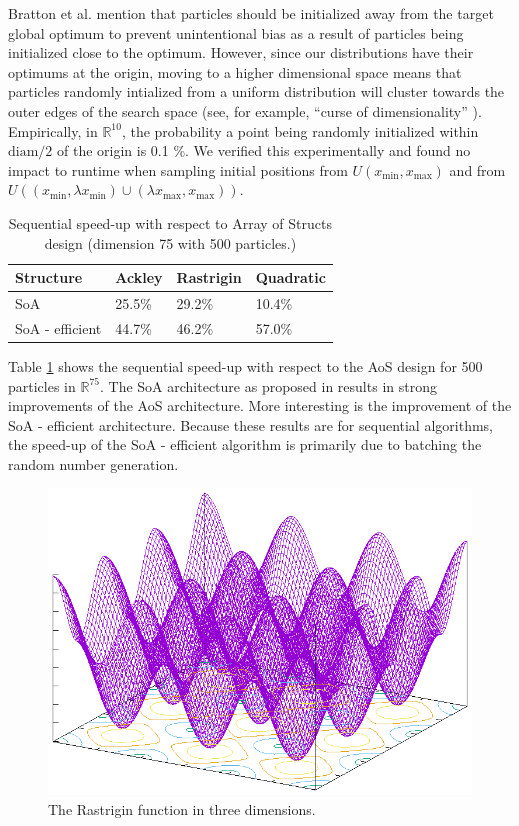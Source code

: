 Bratton et al. \cite{spso} mention that particles should be initialized away
from the target global optimum to prevent unintentional bias as a result of
particles being initialized close to the optimum. However, since our
distributions have their optimums at the origin, moving to a higher dimensional
space means that particles randomly intialized from a uniform distribution will
cluster towards the outer edges of the search space (see, for example, ``curse
of dimensionality'' \cite{hastie}). Empirically, in $\mathbb{R}^{10}$, the
probability a point being randomly initialized within $\text{diam}/2$ of the origin is 0.1 \%.
We verified this experimentally and found no
impact to runtime when sampling initial positions from $U(x_{\min}, x_{\max})$
and from $U((x_{\min},\lambda x_{\min})\cup(\lambda x_{\max}, x_{\max}))$.

\begin{table}
  \centering
  \caption{Sequential speed-up with respect to Array of Structs design (dimension
    75 with 500 particles.)}
  \label{tab:seq-baseline}
\begin{tabular}{llll}\toprule
Structure       & Ackley & Rastrigin & Quadratic \\\midrule
SoA             & 25.5\%  & 29.2\%     & 10.4\%     \\
SoA - efficient & 44.7\%  & 46.2\%     & 57.0\%     \\\bottomrule
\end{tabular}
\end{table}

Table \ref{tab:seq-baseline} shows the sequential speed-up with respect to the
AoS design for 500 particles in $\mathbb{R}^{75}$. The SoA architecture as
proposed in \cite{pso-cache} results in strong improvements of the AoS
architecture. More interesting is the improvement of the SoA - efficient
architecture. Because these results are for sequential algorithms, the speed-up
of the SoA - efficient algorithm is primarily due to batching the random number
generation.


\begin{figure}
  \includegraphics[width=\columnwidth]{../img/output/rastrigin}
  \caption{The Rastrigin function in three dimensions.}\label{fig:rastrigin}
\end{figure}

